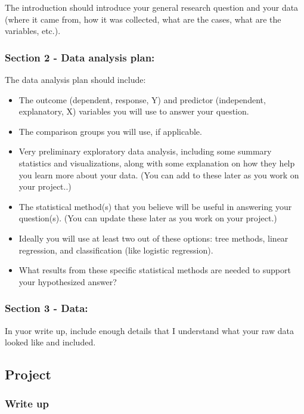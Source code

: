 \documentclass[
]{book}
\providecommand{\tightlist}{%
  \setlength{\itemsep}{0pt}\setlength{\parskip}{0pt}}
\begin{document}
The introduction should introduce your general research
question and your data (where it came from, how it was collected, what
are the cases, what are the variables, etc.).

\hypertarget{section-2---data-analysis-plan}{%
\subsubsection{Section 2 - Data analysis plan:}\label{section-2---data-analysis-plan}}

The data analysis plan should include:

\begin{itemize}
\tightlist
\item
  The outcome (dependent, response, Y) and predictor (independent, explanatory, X)
  variables you will use to answer your question.
\item
  The comparison groups you will use, if applicable.
\item
  Very preliminary exploratory data analysis, including some summary statistics and
  visualizations, along with some explanation on how they help you learn more about your data.
  (You can add to these later as you work on your project..)
\item
  The statistical method(s) that you believe will be useful in answering your question(s).
  (You can update these later as you work on your project.)
\item
  Ideally you will use at least two out of these options: tree methods, linear regression,
  and classification (like logistic regression).
\item
  What results from these specific statistical methods are needed to support your
  hypothesized answer?
\end{itemize}

\hypertarget{section-3---data}{%
\subsubsection{Section 3 - Data:}\label{section-3---data}}

In yuor write up, include enough details that I understand what your raw data looked like
and included.

\hypertarget{project}{%
\subsection{Project}\label{project}}

\hypertarget{write-up}{%
\subsubsection{Write up}\label{write-up}}
\end{document}
